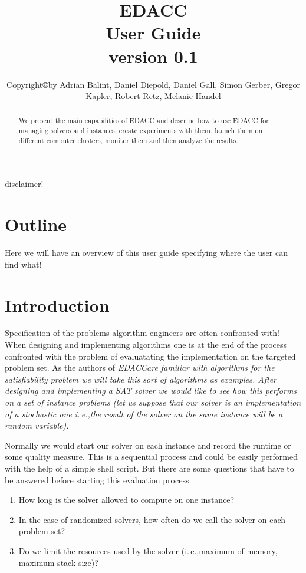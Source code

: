 \documentclass[twoside,a4paper]{refart}
\title{EDACC \\ %
User Guide\\ version 0.1
}
\author{Copyright\copyright by  Adrian Balint, Daniel Diepold, Daniel Gall, Simon Gerber, Gregor Kapler, Robert Retz, Melanie Handel}
\date{}
\newcommand{\ie}{i.\,e.,}
\newcommand{\edacc}{\slshape EDACC}
\newcounter{ex}
\begin{document}
\maketitle

\begin{abstract}
        We present the main capabilities of EDACC and describe how to use EDACC for managing solvers and instances, create experiments with them, launch them on different computer clusters, monitor them and then analyze the results. 
\end{abstract}

disclaimer!

\tableofcontents

\newpage


\section{Outline}
Here we will have an overview of this user guide specifying where the user can find what!

\section{Introduction}
Specification of the problems algorithm engineers are often confronted with! \\
When designing and implementing algorithms one is at the end of the process confronted with the problem of evaluatating the implementation on the targeted problem set. As the authors of \edacc are familiar with algorithms for the satisfiability problem we will take this sort of algorithms as examples. After designing and implementing a SAT solver we would like to see how this performs on a set of instance problems (let us suppose that our solver is an implementation of a stochastic one \ie the result of the solver on the same instance will be a random variable).

Normally we would start our solver on each instance and record the runtime or some quality measure. This is a sequential process and could be easily performed with the help of a simple shell script. But there are some questions that have to be answered before starting this evaluation process. 
\begin{enumerate}
\item How long is the solver allowed to compute on one instance?
\item In the case of randomized solvers, how often do we call the solver on each problem set?
\item Do we limit the resources used by the solver (\ie maximum of memory, maximum stack size)?
\end{enumerate}
\end{document}
